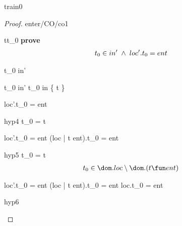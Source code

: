 \documentclass[12pt]{amsart}
\begin{document}
\begin{machine}{train0}
\begin{proof}{enter/CO/co1}
\begin{free:var}{t}{t_0}
	\noindent \textbf{prove}
	\begin{align}
		t_0 \in in' 
			\; \land \; loc'.t_0 = ent
	\end{align}
	\begin{by:parts}
	
		\begin{part:a}{ t_0 \in in' }
		\begin{calculation}
			t_0 \in in'
		\hint{=}{ \ref{a1} }
			t_0 \in in \bunion \{ t \}
		\hint{=}{ \eqref{hyp2} }
			\true
		\end{calculation}

		\end{part:a}
		\begin{part:a}{ loc'.t_0 = ent }
		
		\begin{by:cases}
		
		\begin{case}{hyp4}{ t_0 = t}
		\begin{calculation}
			loc'.t_0 = ent
		\hint{=}{ \ref{a2} }
			(loc | t \fun ent).t_0 = ent
		\hint{=}{ \eqref{hyp4} }
			\true
		\end{calculation}

		\end{case}

		\begin{case}{hyp5}{ \neg t_0 = t}
		\begin{align}
		\assert{hyp6}{ t_0 \in \dom.loc \setminus \dom.(t \fun ent) }
		\end{align}
		\begin{calculation}
			loc'.t_0 = ent
		\hint{=}{ \ref{a2} }
			(loc | t \fun ent).t_0 = ent
		\hint{=}{ \eqref{hyp5} \eqref{hyp6} }
			loc.t_0 = ent
		\hint{=}{ \eqref{hyp3} }
			\true
		\end{calculation}
		\begin{subproof}{hyp6}
		\easy
		\end{subproof}
		\end{case}
		

\end{by:cases}
\end{part:a}
\end{by:parts}
\end{free:var}
\end{proof}
\end{machine}
\end{document}
